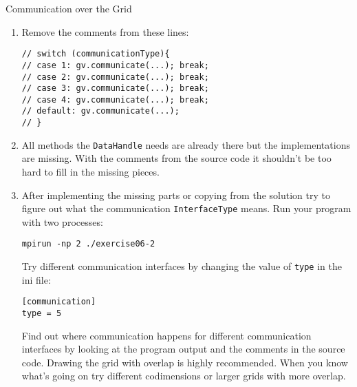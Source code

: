 \documentclass[12pt,a4paper]{article}
\begin{document}
\begin{Exercise}{Communication over the Grid}
  \begin{enumerate}
  \item Remove the comments from these lines:
    \begin{lstlisting}
// switch (communicationType){
// case 1: gv.communicate(...); break;
// case 2: gv.communicate(...); break;
// case 3: gv.communicate(...); break;
// case 4: gv.communicate(...); break;
// default: gv.communicate(...);
// }
    \end{lstlisting}
  \item All methods the \lstinline{DataHandle} needs are already there
    but the implementations are missing.  With the comments from the
    source code it shouldn't be too hard to fill in the missing
    pieces.
  \item After implementing the missing parts or copying from the
    solution try to figure out what the communication
    \lstinline{InterfaceType} means. Run your program with two
    processes:
    \begin{lstlisting}
mpirun -np 2 ./exercise06-2
    \end{lstlisting}
    Try different communication interfaces by changing the value of
    \lstinline{type} in the ini file:
    \begin{lstlisting}
[communication]
type = 5
    \end{lstlisting}
    Find out where communication happens for different communication
    interfaces by looking at the program output and the comments in
    the source code. Drawing the grid with overlap is highly
    recommended. When you know what's going on try different
    codimensions or larger grids with more overlap.
  \end{enumerate}
\end{Exercise}
\end{document}
